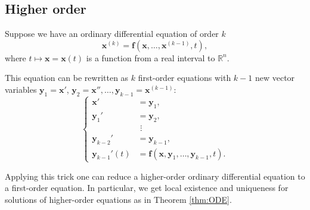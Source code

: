 \subsection*{Higher order}

Suppose we have an ordinary differential equation of order $k$
\[\bm{x}^{(k)}=\bm{f}(\bm{x},\dots,\bm{x}^{(k-1)},t),\]
where $t\mapsto\bm{x}=\bm{x}(t)$ is a function from a real interval to $\mathbb{R}^n$.

This equation can be rewritten as $k$ first-order equations  with $k-1$ new vector variables 
$\bm{y}_1=\bm{x}'$,
$\bm{y}_2=\bm{x}'',\dots,\bm{y}_{k-1}=\bm{x}^{(k-1)}$:
\[
\begin{cases}
\bm{x}'&=\bm{y}_1,
\\
\bm{y}_1'&=\bm{y}_2,
\\
&\,\,\vdots
\\
\bm{y}_{k-2}'&=\bm{y}_{k-1},
\\
\bm{y}_{k-1}'(t)&=\bm{f}(\bm{x},\bm{y}_{1},\dots,\bm{y}_{k-1},t).
\end{cases}
\]

Applying this trick one can reduce a higher-order ordinary differential equation to a first-order equation. 
In particular, we get local existence and uniqueness for solutions of higher-order equations as in Theorem \ref{thm:ODE}.

